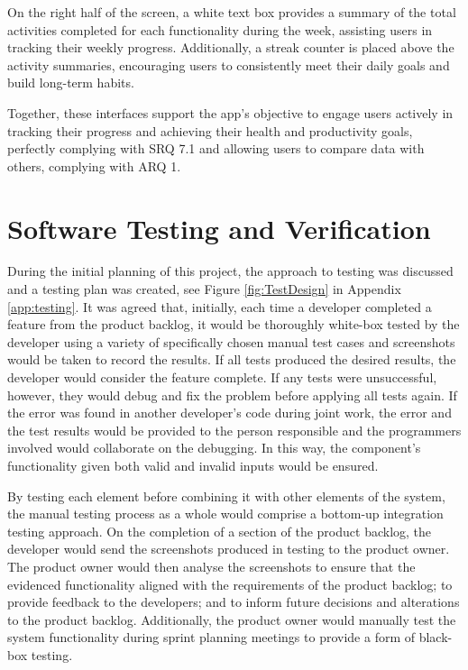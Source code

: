 \documentclass[11pt]{article}
\begin{document}
\newpage

On the right half of the screen, a white text box provides a summary of the
total activities completed for each functionality during the week, assisting
users in tracking their weekly progress. Additionally, a streak counter is
placed above the activity summaries, encouraging users to consistently meet
their daily goals and build long-term habits.\par

Together, these interfaces support the app’s objective to engage users actively
in tracking their progress and achieving their health and productivity goals,
perfectly complying with SRQ 7.1 and allowing users to compare data with
others, complying with ARQ 1.\par


\section{Software Testing and Verification} \label{sec:testing}

During the initial planning of this project, the approach to testing was
discussed and a testing plan was created,  see Figure \ref{fig:TestDesign}
in Appendix \ref{app:testing}. It was agreed that, initially, each time a 
developer completed a feature from the product backlog, it would be thoroughly 
white-box tested by the developer using a variety of specifically chosen manual 
test cases and screenshots would be taken to record the results. If all tests 
produced the desired results, the developer would consider the feature complete. 
If any tests were unsuccessful, however, they would debug and fix the problem 
before applying all tests again. If the error was found in another developer's 
code during joint work, the error and the test results would be provided to the 
person responsible and the programmers involved would collaborate on the debugging. 
In this way, the component's functionality given both valid and invalid inputs would 
be ensured. 

By testing each element before combining it with other elements of the system, the 
manual testing process as a whole would comprise a bottom-up integration testing approach. 
On the completion of a section of the product backlog, the developer would send 
the screenshots produced in testing to the product owner. The product owner would 
then analyse the screenshots to ensure that the evidenced functionality aligned 
with the requirements of the product backlog; to provide feedback to the developers; 
and to inform future decisions and alterations to the product backlog. Additionally, 
the product owner would manually test the system functionality during sprint planning 
meetings to provide a form of black-box testing.\par
\end{document}
